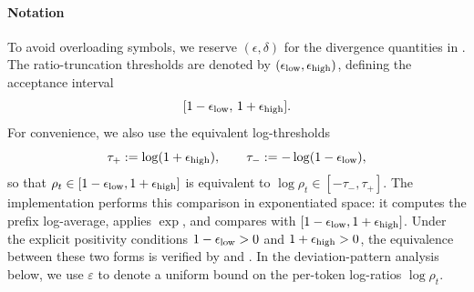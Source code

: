 \paragraph{Notation} To avoid overloading symbols, we reserve $(\epsilon,\delta)$ for the divergence quantities in
. The ratio-truncation thresholds are denoted by $(\epsilon_{\mathrm{low}},\epsilon_{\mathrm{high}})$, defining the acceptance interval
\[
    [1-\epsilon_{\mathrm{low}},\,1+\epsilon_{\mathrm{high}}].
\]
For convenience, we also use the equivalent log-thresholds
\[
    \tau_+ := \log(1+\epsilon_{\mathrm{high}}),
    \qquad
    \tau_- := -\log(1-\epsilon_{\mathrm{low}}),
\]
so that $\rho_t \in [1-\epsilon_{\mathrm{low}},1+\epsilon_{\mathrm{high}}]$ is equivalent to $\log\rho_t \in [-\tau_-,\tau_+]$.
The implementation performs this comparison in exponentiated space: it computes
the prefix log-average, applies $\exp$, and compares with
$[1-\epsilon_{\mathrm{low}},1+\epsilon_{\mathrm{high}}]$. Under the explicit positivity conditions
$1-\epsilon_{\mathrm{low}}>0$ and $1+\epsilon_{\mathrm{high}}>0$, the equivalence between these two forms is
verified by
 and
.
In the deviation-pattern analysis below, we use $\varepsilon$ to denote a uniform bound on the per-token log-ratios $\log\rho_t$.

